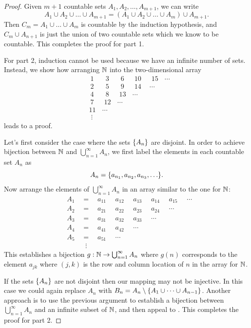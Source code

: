 \documentclass[11pt,twoside=off,numbers=noenddot]{scrbook}
\begin{document}
\begin{proof}
    Given $m + 1$ countable sets $A_1, A_2, \dots, A_{m + 1}$, we can write
    \[ A_1 \cup A_2 \cup \dots \cup A_{m + 1} = (A_1 \cup A_2 \cup \dots \cup A_m) \cup A_{m + 1}. \]
    Then $C_m = A_1 \cup \dots \cup A_m$ is countable by the induction hypothesis, and $C_m \cup A_{n + 1}$ is just the union of two countable sets which we know to be countable. This completes the proof for part 1.

    For part 2, induction cannot be used because we have an infinite number of sets. Instead, we show how arranging $\mathbb N$ into the two-dimensional array
    \begin{align*}
        & \: 1 \quad\,\,\, \: 3 \quad\,\,\, \: 6 \quad\,\,\, 10 \quad\,\,\, 15 \:\:\,\,\, \cdots \\
        & \: 2 \quad\,\,\, \: 5 \quad\,\,\, \: 9 \quad\,\,\, 14 \quad\: \cdots \\
        & \: 4 \quad\,\,\, \: 8 \quad\,\,\, 13 \:\:\,\,\, \cdots \\
        & \: 7 \quad\,\,\, 12 \:\:\,\,\, \cdots \\
        & 11 \:\:\,\,\, \cdots \\
        & \,\, \vdots
    \end{align*}
    leads to a proof.

    Let's first consider the case where the sets $\{ A_n \}$ are disjoint. In order to achieve bijection between $\mathbb N$ and $\bigcup_{n = 1}^{\infty} A_n$, we first label the elements in each countable set $A_n$ as
    \[ A_n = \set{a_{n_1}, a_{n_2}, a_{n_3}, \dots}. \]
    Now arrange the elements of $\bigcup_{n = 1}^{\infty} A_n$ in an array similar to the one for $\mathbb N$:
    \begin{align*}
        & A_1 \quad = \quad a_{11} \quad\,\, a_{12} \quad\,\, a_{13} \quad\,\, a_{14} \quad\,\, a_{15} \quad\,\, \cdots \\
        & A_2 \quad = \quad a_{21} \quad\,\, a_{22} \quad\,\, a_{23} \quad\,\, a_{24} \quad\,\, \cdots \\
        & A_3 \quad = \quad a_{31} \quad\,\, a_{32} \quad\,\, a_{33} \quad\,\, \cdots \\
        & A_4 \quad = \quad a_{41} \quad\,\, a_{42} \quad\,\, \cdots \\
        & A_5 \quad = \quad a_{51} \quad\,\, \cdots \\
        & \qquad\:\,\,\, \vdots
    \end{align*}
    This establishes a bijection $g : \mathbb N \to \bigcup_{n = 1}^{\infty} A_n$ where $g(n)$ corresponds to the element $a_{jk}$ where $(j, k)$ is the row and column location of $n$ in the array for $\mathbb N$.

    If the sets $\{ A_n \}$ are not disjoint then our mapping may not be injective. In this case we could again replace $A_n$ with $B_n = A_n \setminus \{ A_1 \cup \dots \cup A_{n - 1} \}$. Another approach is to use the previous argument to establish a bijection between $\bigcup_{n = 1}^{\infty} A_n$ and an infinite subset of $\mathbb N$, and then appeal to . This completes the proof for part 2.
\end{proof}
\end{document}

